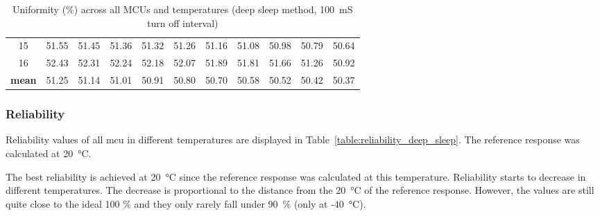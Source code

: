 \begin{table}[ht!]
\begin{tabular}{c||rrrrrrrrrr}
    15   &  51.55 &  51.45 &  51.36 &  51.32 & 51.26 & 51.16 & 51.08 & 50.98 & 50.79 & 50.64 \\
    16   &  52.43 &  52.31 &  52.24 &  52.18 & 52.07 & 51.89 & 51.81 & 51.66 & 51.26 & 50.92 \\
    \textbf{mean} &  51.25 &  51.14 &  51.01 &  50.91 & 50.80 & 50.70 & 50.58 & 50.52 & 50.42 & 50.37 \\
    \bottomrule
    \end{tabular}
    \captionsetup{justification=centering,margin=0.5cm}
    \caption{Uniformity (\%) across all MCUs and temperatures (deep sleep method, 100~mS turn off interval)}
    \label{table:uniformity_deep_sleep}
\end{table}

\subsubsection*{Reliability}

Reliability values of all \gls{mcu} in different temperatures are displayed in Table~\ref{table:reliability_deep_sleep}. The reference response was calculated at 20~°C.

The best reliability is achieved at 20~°C since the reference response was calculated at this temperature. Reliability starts to decrease in different temperatures. The decrease is proportional to the distance from the 20~°C of the reference response. However, the values are still quite close to the ideal 100 \% and they only rarely fall under 90~\% (only at -40~°C).

